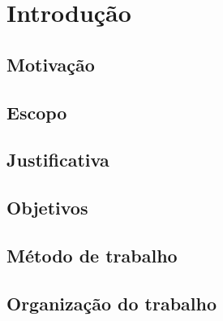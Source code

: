 
\chapter[Introdução]{Introdução}

\section{Motivação}

   


	


\section{Escopo}



\section{Justificativa}


\section{Objetivos}


\section{Método de trabalho}


\section{Organização do trabalho}


